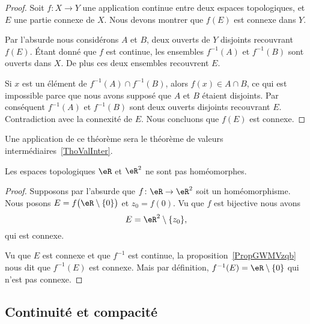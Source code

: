 \begin{proof}
    Soit \( f\colon X\to Y\) une application continue entre deux espaces topologiques, et \( E\) une partie connexe de \( X\). Nous devons montrer que \( f(E)\) est connexe dans \( Y\).

    Par l'absurde nous considérons \( A\) et \( B\), deux ouverts de \( Y\) disjoints recouvrant \( f(E)\). Étant donné que \( f\) est continue, les ensembles \( f^{-1}(A)\) et \( f^{-1}(B)\) sont ouverts dans \( X\). De plus ces deux ensembles recouvrent \( E\).

    Si \( x\) est un élément de \( f^{-1}(A)\cap f^{-1}(B)\), alors \( f(x)\in A\cap B\), ce qui est impossible parce que nous avons supposé que \( A\) et \( B\) étaient disjoints. Par conséquent \( f^{-1}(A)\) et \( f^{-1}(B)\) sont deux ouverts disjoints recouvrant \( E\). Contradiction avec la connexité de \( E\). Nous concluons que \( f(E)\) est connexe.
\end{proof}
Une application de ce théorème sera le théorème de valeurs intermédiaires~\ref{ThoValInter}.

\begin{example}
    Les espaces topologiques \( \eR\) et \( \eR^2\) ne sont pas homéomorphes.
\end{example}

\begin{proof}
    Supposons par l'absurde que \( f\colon \eR\to \eR^2\) soit un  homéomorphisme. Nous posons \( E=f\big( \eR\setminus\{ 0 \} \big)\) et \( z_0=f(0)\). Vu que \( f\) est bijective nous avons
    \begin{equation}
        E=\eR^2\setminus\{ z_0 \},
    \end{equation}
    qui est connexe.

    Vu que \( E\) est connexe et que \( f^{-1}\) est continue, la proposition~\ref{PropGWMVzqb} nous dit que \( f^{-1}(E)\) est connexe. Mais par définition, \( f^{-1}(E)=\eR\setminus\{ 0 \}\) qui n'est pas connexe.
\end{proof}

\subsection{Continuité et compacité}

